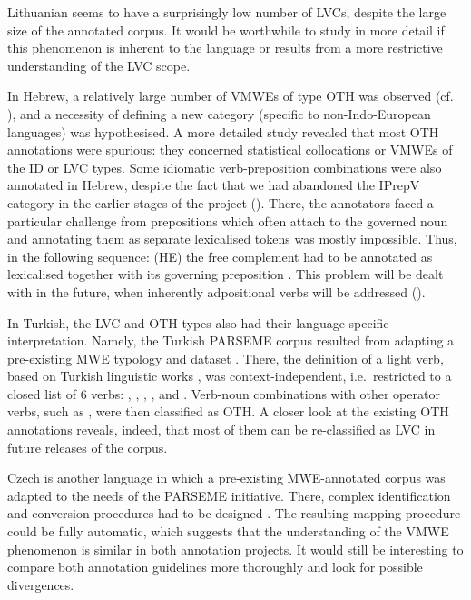 \documentclass[output=paper,modfonts]{langscibook}
\begin{document}
Lithuanian seems to have a surprisingly low number of LVCs, despite the large size of the annotated corpus. It would be worthwhile to study in more detail if this phenomenon is inherent to the language or results from a more restrictive understanding of the LVC scope.

In Hebrew, a relatively large number of VMWEs of type OTH was observed (cf. ), and a necessity of defining a new category (specific to non-Indo-European languages) was hypothesised. A more detailed study revealed that most OTH annotations were spurious: they concerned statistical collocations or VMWEs of the ID or LVC types. Some idiomatic verb-preposition combinations were also annotated in Hebrew, despite the fact that we had abandoned the IPrepV category in the earlier stages of the project (). There, the annotators faced a particular challenge from prepositions which often attach to the governed noun and annotating them as separate lexicalised tokens was mostly impossible. Thus, in the following sequence: 
(HE) %
 the free complement %
 had to be annotated as lexicalised together with its governing preposition %
. This problem will be dealt with in the future, when inherently adpositional verbs will be addressed ().

In Turkish, the LVC and OTH types also had their language-specific interpretation. Namely, the Turkish PARSEME corpus resulted from adapting a pre-existing MWE typology and dataset \citep{ciclingkubra}. There, the definition of a light verb, based on Turkish linguistic works \citep{siemieniec2010some}, was context-independent, i.e.\ restricted to a closed list of 6 verbs: , , , ,  and . Verb-noun combinations with other operator verbs, such as , were then classified as OTH. A closer look at the existing OTH annotations reveals, indeed, that most of them can be re-classified as LVC in future releases of the corpus.

Czech is another language in which a pre-existing MWE-annotated corpus \citep{pdt2017} was adapted to the needs of the PARSEME initiative. There, complex identification and conversion procedures had to be designed \citep{biblio:BeHaExtractingVerbal2017}. 
The resulting mapping procedure could be fully automatic, which suggests that the understanding of the VMWE phenomenon is similar in both annotation projects. It would still be interesting to compare both annotation guidelines more thoroughly and look for possible divergences.
\end{document}
